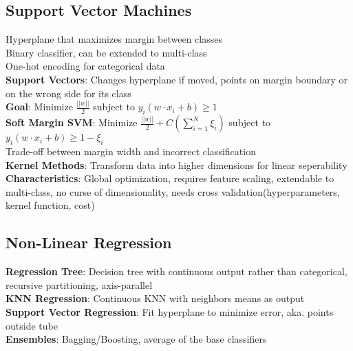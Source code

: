 \documentclass{article}
\begin{document}
\begin{multicols*}{2}
        \subsection*{Support Vector Machines}
        Hyperplane that maximizes margin between classes\\
        Binary classifier, can be extended to multi-class\\
        One-hot encoding for categorical data\\
        \textbf{Support Vectors}: Changes hyperplane if moved, points on margin boundary or on
        the wrong side for its class\\
        \textbf{Goal}: Minimize $\frac{\lvert\lvert w \rvert\rvert}{2}$ subject to $y_i(w \cdot
        x_i + b) \geq 1$\\
        \textbf{Soft Margin SVM}: Minimize $\frac{\lvert\lvert w \rvert\rvert}{2} + C(\sum_{i=1}^{N} \xi_i)$
        subject to $y_i(w \cdot x_i + b) \geq 1 - \xi_i$\\
        Trade-off between margin width and incorrect classification\\
        \textbf{Kernel Methods}: Transform data into higher dimensions for linear seperability\\
        \textbf{Characteristics}: Global optimization, requires feature scaling, extendable to
        multi-class, no curse of dimensionality, needs cross validation(hyperparameters, kernel
        function, cost)\\
        \subsection*{Non-Linear Regression}
        \textbf{Regression Tree}: Decision tree with continuous output rather than
        categorical, recursive partitioning, axis-parallel\\
        \textbf{KNN Regression}: Continuous KNN with neighbors means as output\\
        \textbf{Support Vector Regression}: Fit hyperplane to minimize error,
        aka.
        points outside tube\\
        \textbf{Ensembles}: Bagging/Boosting, average of the base classifiers\\
    \end{multicols*}
\end{document}
